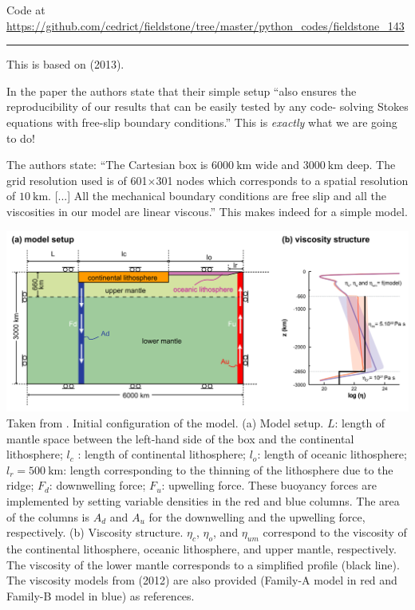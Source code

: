 

\begin{center}
Code at \url{https://github.com/cedrict/fieldstone/tree/master/python_codes/fieldstone_143}
\end{center}

\par\noindent\rule{\textwidth}{0.4pt}


This \stone is based on \textcite{yahb13} (2013). 

In the paper the authors state that their simple setup
``also ensures the reproducibility of our results that can be easily tested by any code-
solving Stokes equations with free-slip boundary conditions.''
This is {\it exactly} what we are going to do!

The authors state: ``The Cartesian box is $6000~\si{\km}$ wide and $3000~\si{\km}$
deep. The grid resolution used is of 601$\times$301 nodes which
corresponds to a spatial resolution of $10~\si{\km}$. [...] 
All the mechanical boundary conditions are free slip and all the viscosities 
in our model are linear viscous.'' This makes indeed for a simple model.

\begin{center}
\includegraphics[width=15cm]{python_codes/fieldstone_143/images/yahb13_a}\\
{\captionfont 
Taken from \cite{yahb13}. Initial configuration of the model. 
(a) Model setup. $L$: length of mantle space between the left-hand 
side of the box and the continental lithosphere; $l_c$ : length of continental lithosphere; 
$l_o$: length of oceanic lithosphere; 
$l_r=500~\si{\km}$: length corresponding to the thinning of the lithosphere due to the ridge; 
$F_d$: downwelling force; 
$F_u$: upwelling force. These buoyancy forces are implemented by setting variable
densities in the red and blue columns. The area of the columns is $A_d$ and $A_u$ for the downwelling and the
upwelling force, respectively. (b) Viscosity structure. $\eta_c$, $\eta_o$, and $\eta_{um}$ correspond
to the viscosity of the continental lithosphere, oceanic lithosphere, and upper mantle, respectively. The
viscosity of the lower mantle corresponds to a simplified profile (black line). The viscosity models from
\cite{civs12} (2012) are also provided (Family-A model in red and Family-B model in blue) as references. }
\end{center}

